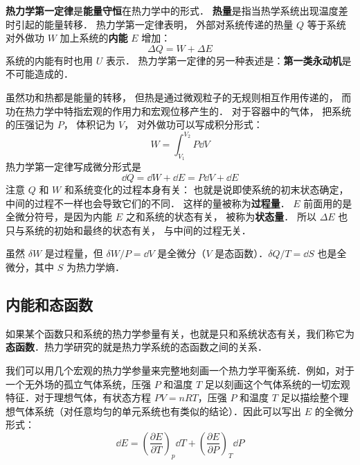 
\begin{issues}
\issueDraft
\end{issues}


\textbf{热力学第一定律}是\textbf{能量守恒}在热力学中的形式． \textbf{热量}是指当热学系统出现温度差时引起的能量转移． 热力学第一定律表明， 外部对系统传递的热量 $Q$ 等于系统对外做功 $W$ 加上系统的\textbf{内能} $E$ 增加：
\begin{equation}\label{Th1Law_eq1}
\Delta Q = W + \Delta E
\end{equation}
系统的内能有时也用 $U$ 表示． 热力学第一定律的另一种表述是：\textbf{第一类永动机}是不可能造成的．

虽然功和热都是能量的转移， 但热是通过微观粒子的无规则相互作用传递的， 而功在热力学中特指宏观的作用力和宏观位移产生的． 对于容器中的气体， 把系统的压强记为 $P$， 体积记为 $V$， 对外做功可以写成积分形式：
\begin{equation}
W = \int_{V_1}^{V_2} P \dd{V}
\end{equation}
热力学第一定律写成微分形式是
\begin{equation}\label{Th1Law_eq2}
\dd Q = \dd W + \dd E = P\dd V + \dd E
\end{equation}
注意 $Q$ 和 $W$ 和系统变化的过程本身有关： 也就是说即使系统的初末状态确定， 中间的过程不一样也会导致它们的不同． 这样的量被称为\textbf{过程量}． $E$ 前面用的是全微分符号，是因为内能 $E$ 之和系统的状态有关， 被称为\textbf{状态量}． 所以 $\Delta E$ 也只与系统的初始和最终的状态有关， 与中间的过程无关．


虽然 $\delta W$ 是过程量，但 $\delta W/P=\dd V$ 是全微分（$V$ 是态函数）．$\delta Q/T=\dd S$ 也是全微分，其中 $S$ 为热力学熵．

\subsection{内能和态函数}
如果某个函数只和系统的热力学参量有关，也就是只和系统状态有关，我们称它为\textbf{态函数}．热力学研究的就是热力学系统的态函数之间的关系．

我们可以用几个宏观的热力学参量来完整地刻画一个热力学平衡系统．例如，对于一个无外场的孤立气体系统，压强 $P$ 和温度 $T$ 足以刻画这个气体系统的一切宏观特征．对于理想气体，有状态方程 $PV=nRT$，压强 $P$ 和温度 $T$ 足以描绘整个理想气体系统（对任意均匀的单元系统也有类似的结论）．因此可以写出 $E$ 的全微分形式：
\begin{equation}
\dd E=\left(\frac{\partial E}{\partial T}\right)_p \dd T + \left(\frac{\partial E}{\partial P}\right)_T \dd P
\end{equation}

